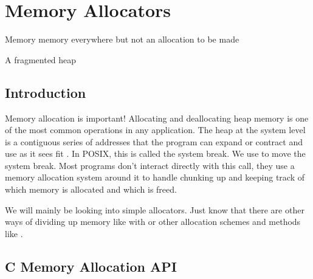 \chapter{Memory Allocators}

\epigraph{Memory memory everywhere but not an allocation to be made}{A fragmented heap}

\section{Introduction}

Memory allocation is important!
Allocating and deallocating heap memory is one of the most common operations in any application.
The heap at the system level is a contiguous series of addresses that the program can expand or contract and use as it sees fit \cite{mallocinternals}.
In POSIX, this is called the system break.
We use  to move the system break.
Most programs don't interact directly with this call, they use a memory allocation system around it to handle chunking up and keeping track of which memory is allocated and which is freed.

We will mainly be looking into simple allocators.
Just know that there are other ways of dividing up memory like with  or other allocation schemes and methods like .

\section{C Memory Allocation API}

